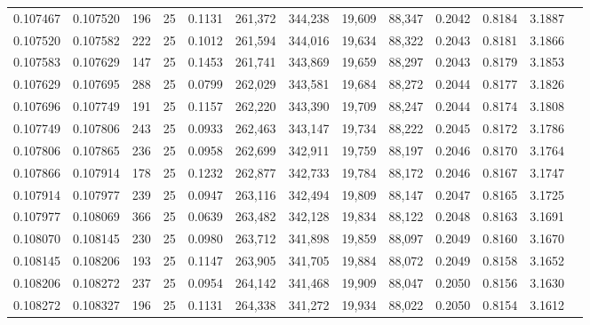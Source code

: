 \begin{tabular}{rrrrrrrrrrrrr}
0.107467 & 0.107520 &   196 &  25 &                                     0.1131 & 261,372 & 344,238 &  19,609 &  88,347 & 0.2042 & 0.8184 & 3.1887 \\
0.107520 & 0.107582 &   222 &  25 &                                     0.1012 & 261,594 & 344,016 &  19,634 &  88,322 & 0.2043 & 0.8181 & 3.1866 \\
0.107583 & 0.107629 &   147 &  25 &                                     0.1453 & 261,741 & 343,869 &  19,659 &  88,297 & 0.2043 & 0.8179 & 3.1853 \\
0.107629 & 0.107695 &   288 &  25 &                                     0.0799 & 262,029 & 343,581 &  19,684 &  88,272 & 0.2044 & 0.8177 & 3.1826 \\
0.107696 & 0.107749 &   191 &  25 &                                     0.1157 & 262,220 & 343,390 &  19,709 &  88,247 & 0.2044 & 0.8174 & 3.1808 \\
0.107749 & 0.107806 &   243 &  25 &                                     0.0933 & 262,463 & 343,147 &  19,734 &  88,222 & 0.2045 & 0.8172 & 3.1786 \\
0.107806 & 0.107865 &   236 &  25 &                                     0.0958 & 262,699 & 342,911 &  19,759 &  88,197 & 0.2046 & 0.8170 & 3.1764 \\
0.107866 & 0.107914 &   178 &  25 &                                     0.1232 & 262,877 & 342,733 &  19,784 &  88,172 & 0.2046 & 0.8167 & 3.1747 \\
0.107914 & 0.107977 &   239 &  25 &                                     0.0947 & 263,116 & 342,494 &  19,809 &  88,147 & 0.2047 & 0.8165 & 3.1725 \\
0.107977 & 0.108069 &   366 &  25 &                                     0.0639 & 263,482 & 342,128 &  19,834 &  88,122 & 0.2048 & 0.8163 & 3.1691 \\
0.108070 & 0.108145 &   230 &  25 &                                     0.0980 & 263,712 & 341,898 &  19,859 &  88,097 & 0.2049 & 0.8160 & 3.1670 \\
0.108145 & 0.108206 &   193 &  25 &                                     0.1147 & 263,905 & 341,705 &  19,884 &  88,072 & 0.2049 & 0.8158 & 3.1652 \\
0.108206 & 0.108272 &   237 &  25 &                                     0.0954 & 264,142 & 341,468 &  19,909 &  88,047 & 0.2050 & 0.8156 & 3.1630 \\
0.108272 & 0.108327 &   196 &  25 &                                     0.1131 & 264,338 & 341,272 &  19,934 &  88,022 & 0.2050 & 0.8154 & 3.1612 \\

\end{tabular}
